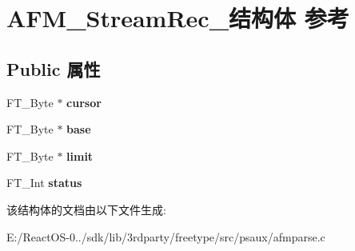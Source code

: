 \hypertarget{struct_a_f_m___stream_rec__}{}\section{A\+F\+M\+\_\+\+Stream\+Rec\+\_\+结构体 参考}
\label{struct_a_f_m___stream_rec__}
\subsection*{Public 属性}
\begin{DoxyCompactItemize}
\item 
\mbox{\label{struct_a_f_m___stream_rec___ab5a467e4625c197b1dbf2c42c54e30c8}} 
F\+T\+\_\+\+Byte $\ast$ {\bfseries cursor}
\item 
\mbox{\label{struct_a_f_m___stream_rec___aca982fdca458c65034e114890a809df0}} 
F\+T\+\_\+\+Byte $\ast$ {\bfseries base}
\item 
\mbox{\label{struct_a_f_m___stream_rec___a0db9e3a634b14255a0e2c349e5d0c9aa}} 
F\+T\+\_\+\+Byte $\ast$ {\bfseries limit}
\item 
\mbox{\label{struct_a_f_m___stream_rec___a65593439b53fcac040c64400955d61e7}} 
F\+T\+\_\+\+Int {\bfseries status}
\end{DoxyCompactItemize}


该结构体的文档由以下文件生成\+:\begin{DoxyCompactItemize}
\item 
E\+:/\+React\+O\+S-\/0../sdk/lib/3rdparty/freetype/src/psaux/afmparse.\+c\end{DoxyCompactItemize}
